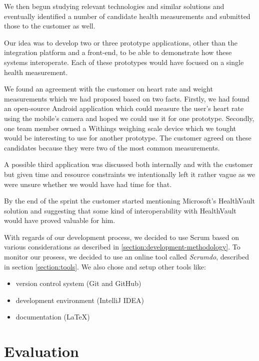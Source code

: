We then begun studying relevant technologies and similar solutions and eventually identified a number of candidate health measurements and submitted those to the customer as well.

Our idea was to develop two or three prototype applications, other than the integration platform and a front-end, to be able to demonstrate how these systems interoperate.
Each of these prototypes would have focused on a single health measurement.

We found an agreement with the customer on heart rate and weight measurements which we had proposed based on two facts. 
Firstly, we had found an open-source Android application which could measure the user's heart rate using the mobile's camera and hoped we could use it for one prototype.
Secondly, one team member owned a Withings weighing scale device which we tought would be interesting to use for another prototype.
The customer agreed on these candidates because they were two of the most common measurements.

A possible third application was discussed both internally and with the customer but given time and resource constraints we intentionally left it rather vague as we were unsure whether we would have had time for that.

By the end of the sprint the customer started mentioning Microsoft's HealthVault solution and suggesting that some kind of interoperability with HealthVault would have proved valuable for him.

With regards of our development process, we decided to use Scrum based on various considerations as described in \ref{section:development-methodology}. 
To monitor our prosess, we decided to use an online tool called \textit{Scrumdo}, described in section \ref{section:tools}. 
We also chose and setup other tools like:
\begin{itemize}
\item version control system (Git and GitHub)
\item development environment (IntelliJ IDEA)
\item documentation (LaTeX)
\end{itemize}

\section{Evaluation}

